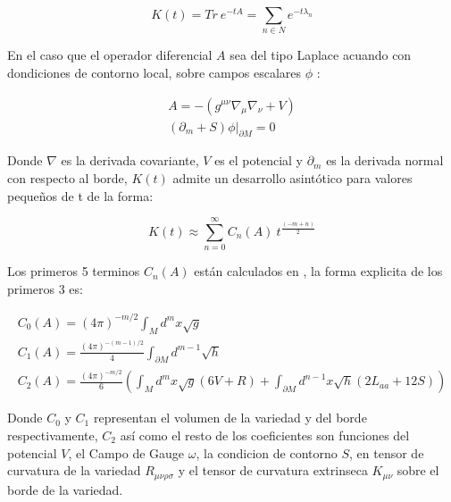 \begin{equation}
K (t) =  Tr \ e ^{-t A} = 
\sum _{n  \in N} e ^{-t \lambda _{n} }
\end{equation}

En el caso que el operador diferencial $A$ sea del tipo Laplace acuando con dondiciones de contorno local, sobre campos escalares $\phi $ :

\begin{equation}
\begin{array}{c}

A = - \left(
			g ^{\mu \nu} \nabla _{\mu} \nabla _{\nu} + V
			\right) \\
\left (\partial _m + S \right) \phi | _{\partial M} = 0

			

\end{array}
\end{equation}

Donde $\nabla$ es la derivada covariante, $V$ es el potencial y $\partial _m$ es la derivada normal con respecto al borde, $K(t)$ admite un desarrollo asintótico para valores pequeños de t  de la forma:

\begin{equation}
K(t) \approx 
\sum _{n=0} ^{\infty}
C _n (A) \ 
t ^{\frac{(-m+n)}{2}}
\label{eq.heat.expansion}
\end{equation}



Los primeros 5 terminos $C _n (A) $ están calculados en \cite{VASSILEVICH2003279}, la forma explicita de los primeros 3 es: 

\begin{equation}
\begin{array}{c}
C _0 (A) = (4 \pi ) ^{-m/2}  \int _M d ^m x \sqrt{g}  \\
C _1 (A) = \frac{(4 \pi) ^{-(m-1)/2} }{4} \int _{\partial M } d ^{m-1} \sqrt{h} \\
C _2 (A) = \frac{(4 \pi) ^{-m/2} }{6} \left(
									\int _M d ^m x\sqrt{g} (6 V + R) +
									\int _{\partial M } d ^{n-1} x 
									\sqrt{h} (2 L _{aa}  + 12 S)
									\right)
\end{array}
\end{equation} 

Donde $C _0$ y $C _1$ representan el volumen de la variedad y del borde respectivamente, $C _2$ así como el resto de los coeficientes son funciones del potencial $V$, el Campo de Gauge $\omega $, la condicion de contorno $S$, en tensor de curvatura de la variedad $R _{\mu \nu \rho \sigma }$ y el tensor de curvatura extrinseca $K _{\mu \nu }$ sobre el borde de la variedad. \\

